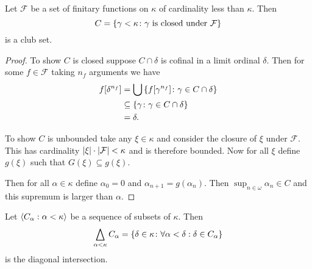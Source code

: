 \begin{proposition}
    Let \(\mathcal{F}\) be a set of finitary functions on \(\kappa\) of
    cardinality less than \(\kappa\). Then
    \[
        C=\left\{\gamma<\kappa\colon\textnormal{\(\gamma\) is closed under \(\mathcal{F}\)}\right\}
    \]
    is a club set.

    \begin{proof}
        To show \(C\) is closed suppose \(C\cap\delta\) is cofinal in a limit
        ordinal \(\delta\). Then for some \(f\in\mathcal{F}\) taking \(n_{f}\)
        arguments we have
        \begin{align*}
            f[\delta^{n_{f}}] & =\bigcup\left\{f[\gamma^{n_{f}}]\colon\gamma\in C\cap\delta\right\} \\
                              & \subseteq\left\{\gamma\colon\gamma\in C\cap\delta\right\}           \\
                              & =\delta.
        \end{align*}

        To show \(C\) is unbounded take any \(\xi\in\kappa\) and consider the
        closure of \(\xi\) under \(\mathcal{F}\). This has cardinality
        \(\lvert\xi\rvert\cdot\lvert\mathcal{F}\rvert<\kappa\) and is therefore bounded. Now
        for all \(\xi\) define \(g(\xi)\) such that \(G(\xi)\subseteq g(\xi)\).

        Then for all \(\alpha\in\kappa\) define \(\alpha_{0}=0\) and
        \(\alpha_{n+1}=g(\alpha_{n})\). Then \(\sup_{n\in\omega}\alpha_{n}\in
        C\) and this supremum is larger than \(\alpha\).
    \end{proof}
\end{proposition}

\begin{definition}
    Let \(\left<C_{\alpha}:\alpha<\kappa\right>\) be a sequence of subsets of
    \(\kappa\). Then
    \[
        \bigtriangleup_{\alpha<\kappa}C_{\alpha}=\left\{\delta\in\kappa\colon\forall\alpha<\delta:\delta\in C_{\alpha}\right\}
    \]
    is the diagonal intersection.
\end{definition}

